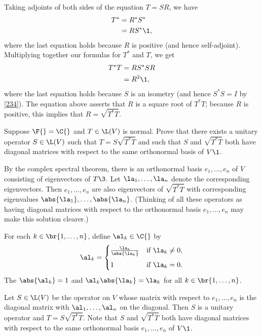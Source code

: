 \begin{Solution}
Taking adjoints of both sides of the equation $T = SR$, we have
\begin{align*}
T^* &= R^* S^* \\
&= RS^*\1,
\end{align*}
where the last equation holds because $R$ is positive (and hence self-adjoint).
Multiplying together our formulas for $T^*$ and $T$, we get
\begin{align*}
T^* T &= RS^* S R \\
& = R^2\1,
\end{align*}
where the last equation holds because $S$ is an isometry (and hence $S^* S = I$
by \ref{234}).  The equation above asserts that $R$ is a square root of $T^*T$;
because $R$ is positive, this implies that $R = \sqrt{T^*T}$.
\end{Solution}

\exercise
Suppose $\F{} = \C{}$ and $T \in \L(V)$ is normal. Prove that there exists a unitary operator $S \in \L(V)$ such that $T = S \sqrt{T^*T}$ and such that $S$ and $\sqrt{T^*T}$ both have diagonal matrices with respect to the same orthonormal basis of $V\1$. \label{8PolarNor}

\begin{Solution}
By the complex spectral theorem, there is an orthonormal basis $e_1, \ldots, e_n$ of $V$ consisting of eigenvectors of $T\3$. Let
$\la_1, \ldots, \la_n$ denote the corresponding eigenvectors. Then $e_1, \ldots, e_n$ are also eigenvectors of $\sqrt{T^* T}$ with corresponding eigenvalues $\abs{\la_1}, \ldots, \abs{\la_n}$. (Thinking of all these operators as having diagonal matrices with respect to the orthonormal basis $e_1, \ldots, e_n$ may make this solution clearer.)

For each $k \in \br{1, \ldots, n}$, define $\al_k \in \C{}$ by
\[
\al_k = \begin{cases}
\frac{ \la_k }{ \abs{\la_k} } & \text{if } \la_k \ne 0, \\[6bp]
1 & \text{if } \la_k = 0.
\end{cases}
\]
The $\abs{\al_k} = 1$ and $\al_k \abs{\la_k} = \la_k$ for all $k \in \br{1, \ldots, n}$.

Let $S \in \L(V)$ be the operator on $V$ whose matrix with respect to $e_1, \ldots, e_n$ is the diagonal matrix with
$\al_1, \ldots, \al_n$ on the diagonal. Then $S$ is a unitary operator and $T = S \sqrt{T^*T}$. Note that $S$ and $\sqrt{T^*T}$ both have diagonal matrices with respect to the same orthonormal basis $e_1, \ldots, e_n$ of $V\1$.
\end{Solution}

